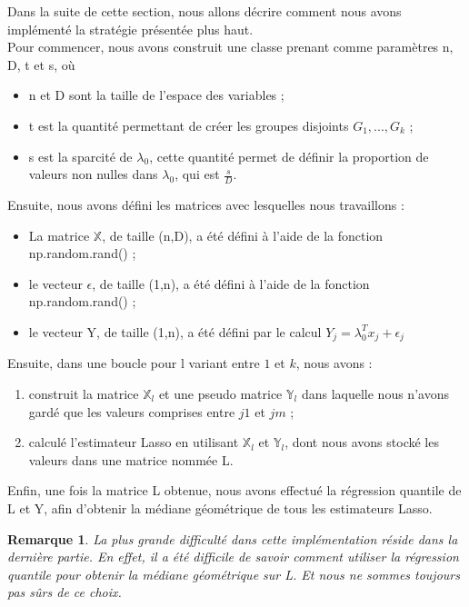 \documentclass{article}
\newtheorem{remark}{Remarque}
\begin{document}
\vspace{0.1cm}
Dans la suite de cette section, nous allons décrire comment nous avons implémenté la stratégie présentée plus haut. \\
Pour commencer, nous avons construit une classe prenant comme paramètres n, D, t et s, où 
\begin{itemize}
    \item n et D sont la taille de l'espace des variables ;
    \item t est la quantité permettant de créer les groupes disjoints $G_1, ..., G_k$ ;
    \item s est la sparcité de $\lambda_0$, cette quantité permet de définir la proportion de valeurs non nulles dans $\lambda_0$, qui est $\frac{s}{D}$.
\end{itemize}
Ensuite, nous avons défini les matrices avec lesquelles nous travaillons : 
\begin{itemize}
    \item La matrice $\mathbb{X}$, de taille (n,D), a été défini à l'aide de la fonction np.random.rand() ;
    \item le vecteur $\epsilon$, de taille (1,n), a été défini à l'aide de la fonction np.random.rand() ;
    \item le vecteur Y, de taille (1,n), a été défini par le calcul $Y_j = \lambda_0^T x_j + \epsilon_j$
    \end{itemize}
Ensuite, dans une boucle pour l variant entre $1$ et $k$, nous avons :
\begin{enumerate}
    \item construit la matrice $\mathbb{X}_l$ et une pseudo matrice $\mathbb{Y}_l$ dans laquelle nous n'avons gardé que les valeurs comprises entre $j1$ et $jm$ ;
    \item calculé l'estimateur Lasso en utilisant $\mathbb{X}_l$ et $\mathbb{Y}_l$, dont nous avons stocké les valeurs dans une matrice nommée L.
\end{enumerate}
Enfin, une fois la matrice L obtenue, nous avons effectué la régression quantile de L et Y, afin d'obtenir la médiane géométrique de tous les estimateurs Lasso. 
\vspace{0.1cm} 
\begin{remark}
La plus grande difficulté dans cette implémentation réside dans la dernière partie. En effet, il a été difficile de savoir comment utiliser la régression quantile pour obtenir la médiane géométrique sur L. Et nous ne sommes toujours pas sûrs de ce choix. 
\end{remark}
\vspace{0.2cm}
\end{document}
